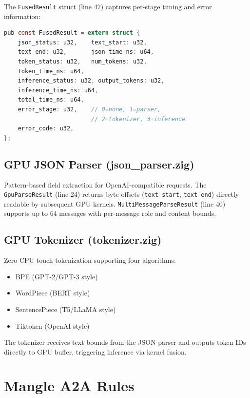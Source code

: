 \documentclass[11pt]{article}
\begin{document}
The \texttt{FusedResult} struct (line 47) captures per-stage timing and error
information:

\begin{lstlisting}[language=C,caption={Fused result structure (kernel\_fusion.zig:47--70)}]
pub const FusedResult = extern struct {
    json_status: u32,    text_start: u32,
    text_end: u32,       json_time_ns: u64,
    token_status: u32,   num_tokens: u32,
    token_time_ns: u64,
    inference_status: u32, output_tokens: u32,
    inference_time_ns: u64,
    total_time_ns: u64,
    error_stage: u32,    // 0=none, 1=parser,
                         // 2=tokenizer, 3=inference
    error_code: u32,
};
\end{lstlisting}

\subsection{GPU JSON Parser (json\_parser.zig)}

Pattern-based field extraction for OpenAI-compatible requests. The
\texttt{GpuParseResult} (line 24) returns byte offsets (\texttt{text\_start},
\texttt{text\_end}) directly readable by subsequent GPU kernels.
\texttt{MultiMessageParseResult} (line 40) supports up to 64 messages with
per-message role and content bounds.

\subsection{GPU Tokenizer (tokenizer.zig)}

Zero-CPU-touch tokenization supporting four algorithms:
\begin{itemize}
  \item BPE (GPT-2/GPT-3 style)
  \item WordPiece (BERT style)
  \item SentencePiece (T5/LLaMA style)
  \item Tiktoken (OpenAI style)
\end{itemize}

The tokenizer receives text bounds from the JSON parser and outputs token IDs
directly to GPU buffer, triggering inference via kernel fusion.

\section{Mangle A2A Rules}
\label{sec:mangle}
\end{document}
